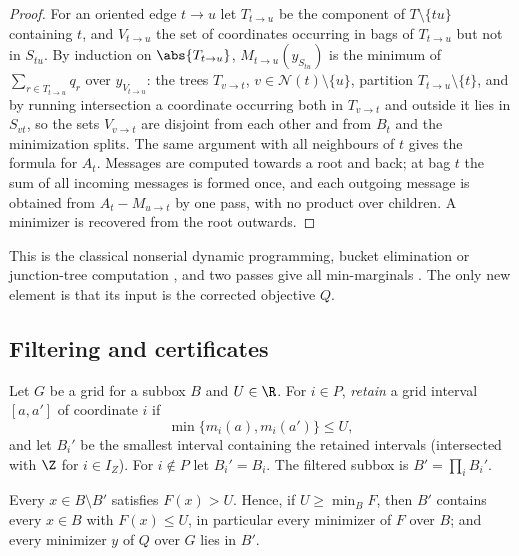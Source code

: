 \begin{proof}
For an oriented edge $t\to u$ let $T_{t\to u}$ be the component of
$T\setminus\{tu\}$ containing $t$, and $V_{t\to u}$ the set of coordinates
occurring in bags of $T_{t\to u}$ but not in $S_{tu}$. By induction on
$\abs{T_{t\to u}}$, $M_{t\to u}(y_{S_{tu}})$ is the minimum of
$\sum_{r\in T_{t\to u}}q_r$ over $y_{V_{t\to u}}$: the trees $T_{v\to t}$,
$v\in\mathcal N(t)\setminus\{u\}$, partition $T_{t\to u}\setminus\{t\}$, and by
running intersection a coordinate occurring both in $T_{v\to t}$ and outside it
lies in $S_{vt}$, so the sets $V_{v\to t}$ are disjoint from each other and
from $B_t$ and the minimization splits. The same argument with all neighbours
of $t$ gives the formula for $A_t$. Messages are computed towards a root and
back; at bag $t$ the sum of all incoming messages is formed once, and each
outgoing message is obtained from $A_t-M_{u\to t}$ by one pass, with no
product over children. A minimizer is recovered from the root outwards.
\end{proof}

This is the classical nonserial dynamic programming, bucket elimination or
junction-tree computation \cite{BerteleBrioschi1972,Dechter1999,
LauritzenSpiegelhalter1988}, and two passes give all min-marginals
\cite{WainwrightJaakkolaWillsky2005,KohliTorr2006}. The only new element is
that its input is the corrected objective $Q$.

\subsection{Filtering and certificates}

\begin{definition}\label{def:filter}
Let $G$ be a grid for a subbox $B$ and $U\in\R$. For $i\in P$, \emph{retain}
a grid interval $[a,a']$ of coordinate $i$ if
\begin{equation}\label{eq:retain}
\min\{m_i(a),m_i(a')\}\le U ,
\end{equation}
and let $B_i'$ be the smallest interval containing the retained intervals
(intersected with $\Z$ for $i\in I_Z$). For $i\notin P$ let $B_i'=B_i$. The
filtered subbox is $B'=\prod_iB_i'$.
\end{definition}

\begin{proposition}\label{prop:filter}
Every $x\in B\setminus B'$ satisfies $F(x)>U$. Hence, if $U\ge\min_BF$, then
$B'$ contains every $x\in B$ with $F(x)\le U$, in particular every minimizer
of $F$ over $B$; and every minimizer $y$ of $Q$ over $G$ lies in $B'$.
\end{proposition}

